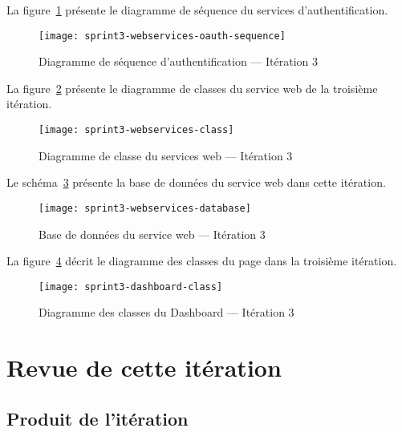 La figure~\ref{fig:sprint3-webservices-oauth-sequence} présente le diagramme de
séquence du services d'authentification.

\begin{figure}[H]
    \centering
    \texttt{[image: sprint3-webservices-oauth-sequence]}
    \caption{Diagramme de séquence d'authentification --- Itération 3}
\label{fig:sprint3-webservices-oauth-sequence}
\end{figure}

La figure~\ref{fig:sprint3-webservices-class} présente le diagramme de classes
du service web de la troisième itération.

\begin{figure}[H]
    \centering
    \texttt{[image: sprint3-webservices-class]}
    \caption{Diagramme de classe du services web --- Itération 3}
\label{fig:sprint3-webservices-class}
\end{figure}

Le schéma~\ref{fig:sprint3-webservices-database} présente la base de données du
service web dans cette itération.

\begin{figure}[H]
    \centering
    \texttt{[image: sprint3-webservices-database]}
    \caption{Base de données du service web --- Itération 3}
\label{fig:sprint3-webservices-database}
\end{figure}

La figure~\ref{fig:sprint3-dashboard-classs} décrit le diagramme des classes du
page  dans la troisième itération.

\begin{figure}[H]
    \centering
    \texttt{[image: sprint3-dashboard-class]}
    \caption{Diagramme des classes du Dashboard --- Itération 3}
\label{fig:sprint3-dashboard-classs}
\end{figure}

\section{Revue de cette itération}


\subsection{Produit de l'itération}

